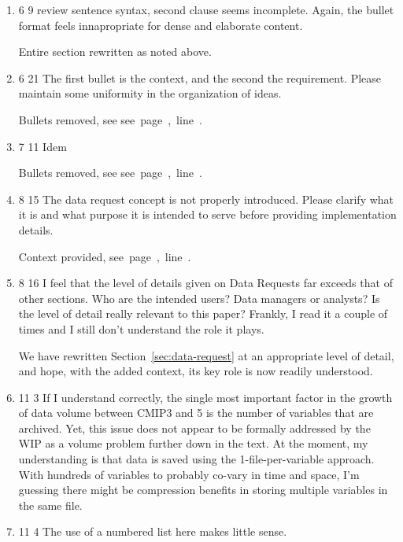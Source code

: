 \documentclass[gmd,manuscript]{copernicus}
\newcommand{\plref}[1]{\mbox{see page \pageref{p-#1}, line
    \lineref{l-#1}.}}
\newenvironment{answer}{\color{blue}}{}
\begin{document}
\begin{enumerate}[label=RC2-\arabic*,leftmargin=*]
  \begin{answer}
    We thank the reviewer for this useful guidance, and the entire
    Section~\ref{sec:infra-principles} has been rewritten as
    suggested, without bullets. Also, re ``changes'', \plref{RC2-14}
  \end{answer}
\item 6 9 review sentence syntax, second clause seems incomplete.
  Again, the bullet format feels innapropriate for dense and elaborate
  content.

  \begin{answer}
    Entire section rewritten as noted above.
  \end{answer}
\item 6 21 The first bullet is the context, and the second the
  requirement. Please maintain some uniformity in the organization of
  ideas.

  \begin{answer}
    Bullets removed, see \plref{RC2-16}
  \end{answer}
\item 7 11 Idem

  \begin{answer}
    Bullets removed, see \plref{RC2-17}
  \end{answer}
\item 8 15 The data request concept is not properly introduced. Please
  clarify what it is and what purpose it is intended to serve before
  providing implementation details.

  \begin{answer}
    Context provided, \plref{RC2-18}
  \end{answer}
\item 8 16 I feel that the level of details given on Data Requests far
  exceeds that of other sections. Who are the intended users? Data
  managers or analysts? Is the level of detail really relevant to this
  paper? Frankly, I read it a couple of times and I still don’t
  understand the role it plays.

  \begin{answer}
    We have rewritten Section~\ref{sec:data-request} at an appropriate
    level of detail, and hope, with the added context, its key role is
    now readily understood.
  \end{answer}
\item 11 3 If I understand correctly, the single most important factor
  in the growth of data volume between CMIP3 and 5 is the number of
  variables that are archived. Yet, this issue does not appear to be
  formally addressed by the WIP as a volume problem further down in
  the text. At the moment, my understanding is that data is saved
  using the 1-file-per-variable approach. With hundreds of variables
  to probably co-vary in time and space, I’m guessing there might be
  compression benefits in storing multiple variables in the same file.
\item 11 4 The use of a numbered list here makes little sense.


\end{enumerate}
\end{document}
